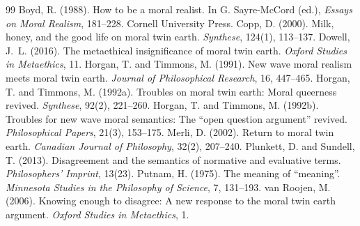 \documentclass{situationist-preprint}
\begin{document}
\begin{thebibliography}{99}\small
{} Boyd, R. (1988). How to be a moral realist. In G. Sayre-McCord (ed.), \emph{Essays on Moral Realism}, 181--228. Cornell University Press.
 Copp, D. (2000). Milk, honey, and the good life on moral twin earth. \emph{Synthese}, 124(1), 113--137.
 Dowell, J.~L. (2016). The metaethical insignificance of moral twin earth. \emph{Oxford Studies in Metaethics}, 11.
 Horgan, T. and Timmons, M. (1991). New wave moral realism meets moral twin earth. \emph{Journal of Philosophical Research}, 16, 447--465.
 Horgan, T. and Timmons, M. (1992a). Troubles on moral twin earth: Moral queerness revived. \emph{Synthese}, 92(2), 221--260.
 Horgan, T. and Timmons, M. (1992b). Troubles for new wave moral semantics: The \enquote{open question argument} revived. \emph{Philosophical Papers}, 21(3), 153--175.
 Merli, D. (2002). Return to moral twin earth. \emph{Canadian Journal of Philosophy}, 32(2), 207--240.
 Plunkett, D. and Sundell, T. (2013). Disagreement and the semantics of normative and evaluative terms. \emph{Philosophers' Imprint}, 13(23).
 Putnam, H. (1975). The meaning of \enquote{meaning}. \emph{Minnesota Studies in the Philosophy of Science}, 7, 131--193.
 van Roojen, M. (2006). Knowing enough to disagree: A new response to the moral twin earth argument. \emph{Oxford Studies in Metaethics}, 1.
\end{thebibliography}
\end{document}
